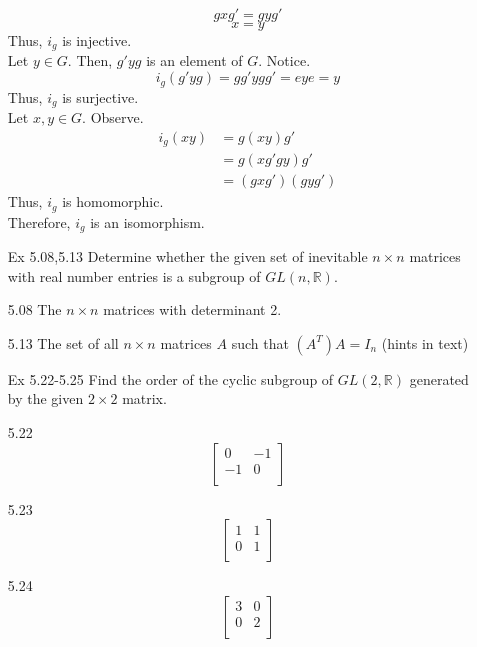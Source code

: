 \documentclass[12pt]{article}
\newcommand{\R}{\mathbb{R}}
\begin{document}
\begin{enumerate}
					\[gxg'=gyg'\]
					\[x=y\]
				Thus, $i_g $ is injective.\\
				Let $ y\in G $. Then, $ g'yg $ is an element of $ G $. Notice.
					\[i_g(g'yg)=gg'ygg'=eye=y\]
				Thus, $ i_g $ is surjective.\\
				Let $ x,y\in G $. Observe.
				\begin{align*}
					i_g(xy) &= g(xy)g'\\
							&= g(xg'gy)g'\\
							&= (gxg')(gyg')
				\end{align*}
				Thus, $ i_g $ is homomorphic.\\
				Therefore, $ i_g $ is an isomorphism.
		\item[Ex 5.08,5.13] Determine whether the given set of inevitable $n \times  n$ matrices with real number entries is a subgroup of $GL(n,\R)$.
			\item[5.08] The $ n \times n $ matrices with determinant 2.
			\item[5.13] The set of all $n \times n$ matrices $A$ such that $(A^T)A=I_n$ (hints in text)
		\item[Ex 5.22-5.25] Find the order of the cyclic subgroup of $GL(2,\R)$ generated by the given $2 \times 2$ matrix. 
		
		\item[5.22]\[
		\begin{bmatrix}
		0   & -1 \\
		-1   & 0 \\
		\end{bmatrix}\]
	\item[5.23]\[
		\begin{bmatrix}
		1   & 1 \\
		0   & 1 \\
		\end{bmatrix}
		\]
	\item[5.24] \[
		\begin{bmatrix}
		3   & 0 \\
		0   & 2 \\
		\end{bmatrix}
		\]
		

\end{enumerate}
\end{document}
